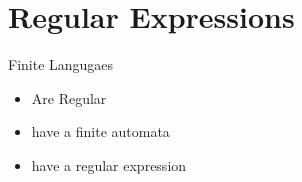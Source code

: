 
\section{Regular Expressions}

Finite Langugaes
\begin{itemize}
    \item Are Regular
    \item have a finite automata 
    \item have a regular expression
\end{itemize}





